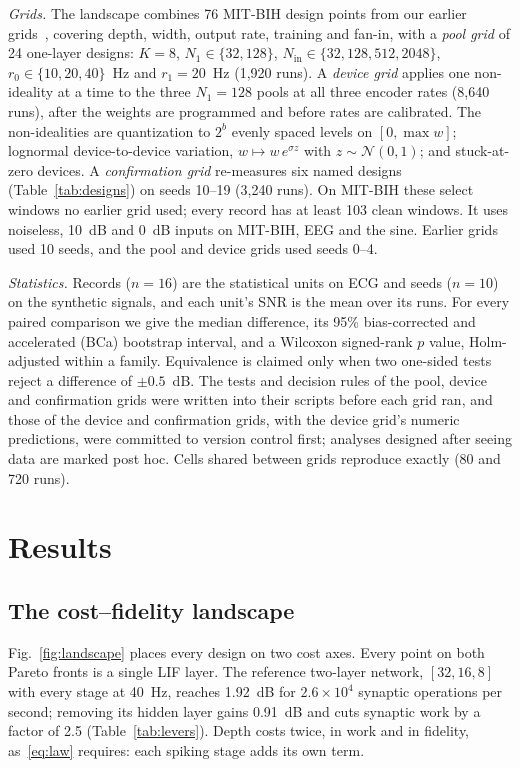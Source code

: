 \documentclass[conference]{IEEEtran}
\newcommand{\dB}{~dB}
\newcommand{\Nin}{N_\mathrm{in}}
\begin{document}
\emph{Grids.} The landscape combines 76 MIT-BIH design points from our earlier
grids~\cite{baig2026icee}, covering depth, width, output rate, training and fan-in, with a
\emph{pool grid} of 24 one-layer designs: $K = 8$, $N_1 \in \{32, 128\}$,
$\Nin \in \{32, 128, 512, 2048\}$, $r_0 \in \{10, 20, 40\}$~Hz and $r_1 = 20$~Hz
(1,920 runs). A \emph{device grid} applies one non-ideality at a time to the
three $N_1 = 128$ pools at all three encoder rates (8,640 runs), after the
weights are programmed and before rates are calibrated. The non-idealities
are quantization to $2^b$ evenly spaced levels on $[0, \max w]$; lognormal
device-to-device variation, $w \mapsto w\,e^{\sigma z}$ with $z \sim
\mathcal{N}(0,1)$; and stuck-at-zero devices. A \emph{confirmation grid}
re-measures six named designs (Table~\ref{tab:designs}) on seeds 10--19 (3,240
runs). On MIT-BIH these select windows no earlier grid used; every record has
at least 103 clean windows. It uses noiseless, 10\dB{} and 0\dB{} inputs on
MIT-BIH, EEG and the sine. Earlier grids used 10 seeds, and the pool and device
grids used seeds 0--4.

\emph{Statistics.} Records ($n = 16$) are the statistical units on ECG and
seeds ($n = 10$) on the synthetic signals, and each unit's SNR is the mean over
its runs. For every paired comparison we give the median difference, its
95\% bias-corrected and accelerated (BCa) bootstrap interval, and a Wilcoxon
signed-rank $p$ value, Holm-adjusted within a family. Equivalence is claimed
only when two one-sided tests reject a difference of $\pm0.5$\dB. The tests and decision rules of the pool, device and confirmation
grids were written into their scripts before each grid ran, and those of the
device and confirmation grids, with the device grid's numeric predictions, were
committed to version control first; analyses designed after seeing data are
marked post hoc. Cells shared between grids
reproduce exactly (80 and 720 runs).

\section{Results}

\subsection{The cost--fidelity landscape}
\label{sec:landscape}

Fig.~\ref{fig:landscape} places every design on two cost axes. Every point on
both Pareto fronts is a single LIF layer. The reference two-layer network,
$[32,16,8]$ with every stage at 40~Hz, reaches 1.92\dB{} for $2.6\times10^4$
synaptic operations per second; removing its hidden layer gains 0.91\dB{} and
cuts synaptic work by a factor of 2.5 (Table~\ref{tab:levers}). Depth costs
twice, in work and in fidelity, as~\eqref{eq:law} requires: each spiking stage
adds its own term.
\end{document}

